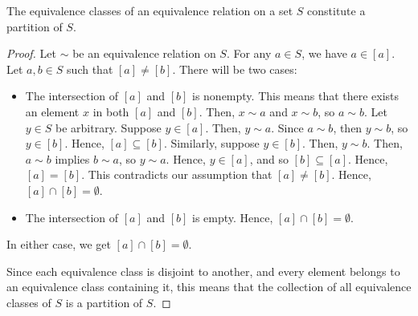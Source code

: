     \begin{thm}
        The equivalence classes of an equivalence relation on a set \(S\) constitute a partition of \(S\).
    \end{thm}

    \begin{proof}
        Let \(\sim\) be an equivalence relation on \(S\). For any \(a\in S\), we have \(a\in [a]\). Let \(a,b\in S\) such that \([a] \neq [b]\). There will be two cases:
        \begin{itemize}
            \item The intersection of \([a]\) and \([b]\) is nonempty.
            This means that there exists an element \(x\) in both \([a]\) and \([b]\). Then, \(x \sim a\) and \(x \sim b\), so \(a \sim b\). Let \(y\in S\) be arbitrary. Suppose \(y \in [a]\). Then, \(y \sim a\). Since \(a \sim b\), then \(y \sim b\), so \(y \in [b]\). Hence, \([a] \subseteq [b]\). Similarly, suppose \(y \in [b]\). Then, \(y \sim b\). Then, \(a \sim b\) implies \(b \sim a\), so \(y \sim a\). Hence, \(y \in [a]\), and so \([b] \subseteq [a]\). Hence, \([a] = [b]\). This contradicts our assumption that \([a] \neq [b]\). Hence, \([a] \cap [b] = \emptyset\).

            \item The intersection of \([a]\) and \([b]\) is empty.
                Hence, \([a] \cap [b] = \emptyset\).
        \end{itemize}
        In either case, we get \([a] \cap [b] = \emptyset\).

        Since each equivalence class is disjoint to another, and every element belongs to an equivalence class containing it, this means that the collection of all equivalence classes of \(S\) is a partition of \(S\).
    \end{proof}

